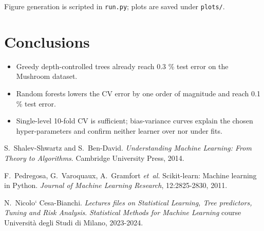 \documentclass[12pt]{report}
\begin{document}
Figure generation is scripted in \texttt{run.py}; plots are saved under
\texttt{plots/}.

\section*{Conclusions}

\begin{itemize}
  \item Greedy depth-controlled trees already reach 0.3 \% test error on the Mushroom dataset.
  \item Random forests lowers the CV error by one order of magnitude and reach 0.1 \% test error.
  \item Single-level 10-fold CV is sufficient; bias-variance curves explain the chosen 
        hyper-parameters and confirm neither learner over nor under fits.
\end{itemize}

\begingroup
\setlength{\bibsep}{1pt}
\begin{thebibliography}{9}

S.~Shalev-Shwartz and S.~Ben-David.
\newblock \emph{Understanding Machine Learning: From Theory to Algorithms}.
\newblock Cambridge University Press, 2014.

F.~Pedregosa, G.~Varoquaux, A.~Gramfort \emph{et~al.}
\newblock Scikit-learn: Machine learning in {P}ython.
\newblock \emph{Journal of Machine Learning Research}, 12:2825-2830, 2011.

N.~Nicolo` Cesa-Bianchi.
\newblock \emph{Lectures files on Statistical Learning, Tree predictors, Tuning and
Risk Analysis}. 
\newblock \emph{Statistical Methods for Machine Learning} course Università degli
Studi di Milano, 2023-2024.

\end{thebibliography}
\endgroup
\end{document}

